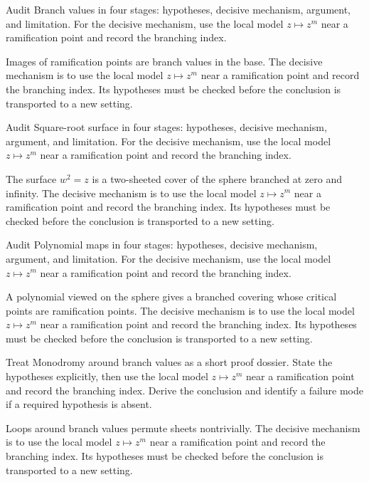 \begin{problem}\label{prob:iv24-problem-04}
Audit Branch values in four stages: hypotheses, decisive mechanism, argument, and limitation. For the decisive mechanism, use the local model \(z\mapsto z^m\) near a ramification point and record the branching index.
\end{problem}
\begin{solution}
Images of ramification points are branch values in the base. The decisive mechanism is to use the local model \(z\mapsto z^m\) near a ramification point and record the branching index. Its hypotheses must be checked before the conclusion is transported to a new setting.
\end{solution}

\begin{problem}\label{prob:iv24-problem-05}
Audit Square-root surface in four stages: hypotheses, decisive mechanism, argument, and limitation. For the decisive mechanism, use the local model \(z\mapsto z^m\) near a ramification point and record the branching index.
\end{problem}
\begin{solution}
The surface $w^2=z$ is a two-sheeted cover of the sphere branched at zero and infinity. The decisive mechanism is to use the local model \(z\mapsto z^m\) near a ramification point and record the branching index. Its hypotheses must be checked before the conclusion is transported to a new setting.
\end{solution}

\begin{problem}\label{prob:iv24-problem-06}
Audit Polynomial maps in four stages: hypotheses, decisive mechanism, argument, and limitation. For the decisive mechanism, use the local model \(z\mapsto z^m\) near a ramification point and record the branching index.
\end{problem}
\begin{solution}
A polynomial viewed on the sphere gives a branched covering whose critical points are ramification points. The decisive mechanism is to use the local model \(z\mapsto z^m\) near a ramification point and record the branching index. Its hypotheses must be checked before the conclusion is transported to a new setting.
\end{solution}

\begin{problem}\label{prob:iv24-problem-07}
Treat Monodromy around branch values as a short proof dossier. State the hypotheses explicitly, then use the local model \(z\mapsto z^m\) near a ramification point and record the branching index. Derive the conclusion and identify a failure mode if a required hypothesis is absent.
\end{problem}
\begin{solution}
Loops around branch values permute sheets nontrivially. The decisive mechanism is to use the local model \(z\mapsto z^m\) near a ramification point and record the branching index. Its hypotheses must be checked before the conclusion is transported to a new setting.
\end{solution}


